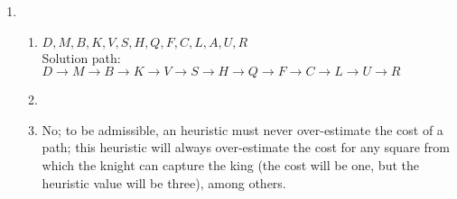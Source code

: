 \documentclass{article}
\begin{document}
\begin{enumerate}
    \item
    \begin{enumerate}
        \item $D, M, B, K, V, S, H, Q, F, C, L, A, U, R$\\
            Solution path: $D{\rightarrow}M{\rightarrow}B{\rightarrow}K{\rightarrow}V{\rightarrow}S{\rightarrow}H{\rightarrow}Q{\rightarrow}F{\rightarrow}C{\rightarrow}L{\rightarrow}U{\rightarrow}R$
        \item

        \item No; to be admissible, an heuristic must never over-estimate the cost of a path; this heuristic will always over-estimate the cost for any square from which the knight can capture the king (the cost will be one, but the heuristic value will be three), among others.
            
    \end{enumerate}
\end{enumerate}
\end{document}
